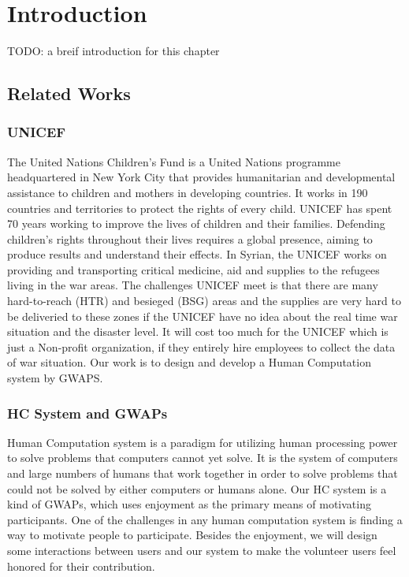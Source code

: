 \section{Introduction}

TODO: a breif introduction for this chapter

\subsection{Related Works}

\subsubsection{UNICEF}
  The United Nations Children's Fund\cite{unicef1994state} is a United Nations programme headquartered
  in New York City that provides humanitarian and developmental assistance to 
  children and mothers in developing countries. 
  It works in 190 countries and territories to protect the rights of every child. 
  UNICEF has spent 70 years working to improve the lives of children and their families. 
  Defending children's rights throughout their lives requires a global presence, 
  aiming to produce results and understand their effects. 
  In Syrian, the UNICEF works on providing and transporting critical medicine, 
  aid and supplies to the refugees living in the war areas. The challenges UNICEF meet is that 
  there are many hard-to-reach (HTR) and besieged (BSG) areas and the supplies are 
  very hard to be deliveried to these zones if the UNICEF have no idea about 
  the real time war situation and the disaster level. It will cost too much for the UNICEF 
  which is just a Non-profit organization, if they entirely hire employees to 
  collect the data of war situation. 
  Our work is to design and develop a Human Computation system by GWAPS\cite{lafourcade2015games}.

  \subsubsection{HC System and GWAPs}
  Human Computation system is a paradigm for utilizing human processing power to solve problems that 
  computers cannot yet solve\cite{quinn2011human}. 
  It is the system of computers and large numbers of humans that work together in order to solve problems that 
  could not be solved by either computers or humans alone\cite{quinn2009taxonomy}.
  Our HC system is a kind of GWAPs, which uses enjoyment as the primary means of motivating participants. 
  One of the challenges in any human computation system is finding a way to motivate people 
  to participate\cite{quinn2011human}. 
  Besides the enjoyment, we will design some interactions between users and our system to 
  make the volunteer users feel honored for their contribution.

